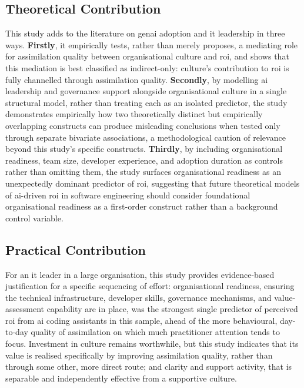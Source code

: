 \subsection{Theoretical Contribution}
\label{sec:Theoretical Contribution}
This study adds to the literature on \gls{genai} adoption and \gls{it} leadership in three ways. \textbf{Firstly}, it empirically tests, rather than merely proposes, a mediating role for assimilation quality between organisational culture and \gls{roi}, and shows that this mediation is best classified as indirect-only: culture's contribution to \gls{roi} is fully channelled through assimilation quality. \textbf{Secondly}, by modelling \gls{ai} leadership and governance support alongside organisational culture in a single structural model, rather than treating each as an isolated predictor, the study demonstrates empirically how two theoretically distinct but empirically overlapping constructs can produce misleading conclusions when tested only through separate bivariate associations, a methodological caution of relevance beyond this study's specific constructs. \textbf{Thirdly}, by including organisational readiness, team size, developer experience, and adoption duration as controls rather than omitting them, the study surfaces organisational readiness as an unexpectedly dominant predictor of \gls{roi}, suggesting that future theoretical models of \gls{ai}-driven \gls{roi} in software engineering should consider foundational organisational readiness as a first-order construct rather than a background control variable.

\subsection{Practical Contribution}
\label{sec:Practical Contribution}
For an \gls{it} leader in a large organisation, this study provides evidence-based justification for a specific sequencing of effort: organisational readiness, ensuring the technical infrastructure, developer skills, governance mechanisms, and value-assessment capability are in place, was the strongest single predictor of perceived \gls{roi} from \gls{ai} coding assistants in this sample, ahead of the more behavioural, day-to-day quality of assimilation on which much practitioner attention tends to focus. Investment in culture remains worthwhile, but this study indicates that its value is realised specifically by improving assimilation quality, rather than through some other, more direct route; and clarity and support activity, that is separable and independently effective from a supportive culture.


